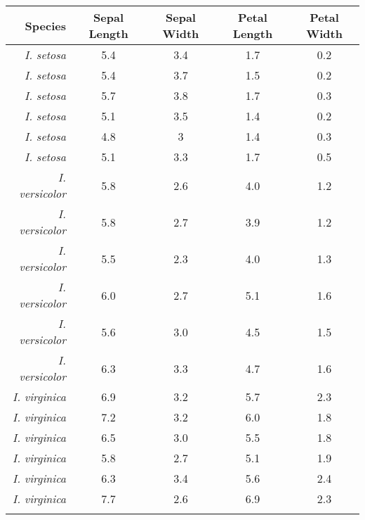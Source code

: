\begin{tabular}{ r c c c c }
\textbf{Species}&\textbf{Sepal Length}&\textbf{Sepal Width}&\textbf{Petal Length}&\textbf{Petal Width}\\\hline
\textit{I. setosa}&5.4&3.4&1.7&0.2\\
\textit{I. setosa}&5.4&3.7&1.5&0.2\\
\textit{I. setosa}&5.7&3.8&1.7&0.3\\
\textit{I. setosa}&5.1&3.5&1.4&0.2\\
\textit{I. setosa}&4.8&3&1.4&0.3\\
\textit{I. setosa}&5.1&3.3&1.7&0.5\\\arrayrulecolor{black!25}\hline
\textit{I. versicolor}&5.8&2.6&4.0&1.2\\
\textit{I. versicolor}&5.8&2.7&3.9&1.2\\
\textit{I. versicolor}&5.5&2.3&4.0&1.3\\
\textit{I. versicolor}&6.0&2.7&5.1&1.6\\
\textit{I. versicolor}&5.6&3.0&4.5&1.5\\
\textit{I. versicolor}&6.3&3.3&4.7&1.6\\\hline
\textit{I. virginica}&6.9&3.2&5.7&2.3\\
\textit{I. virginica}&7.2&3.2&6.0&1.8\\
\textit{I. virginica}&6.5&3.0&5.5&1.8\\
\textit{I. virginica}&5.8&2.7&5.1&1.9\\
\textit{I. virginica}&6.3&3.4&5.6&2.4\\
\textit{I. virginica}&7.7&2.6&6.9&2.3\\\arrayrulecolor{black}\hline\hline
\end{tabular}
